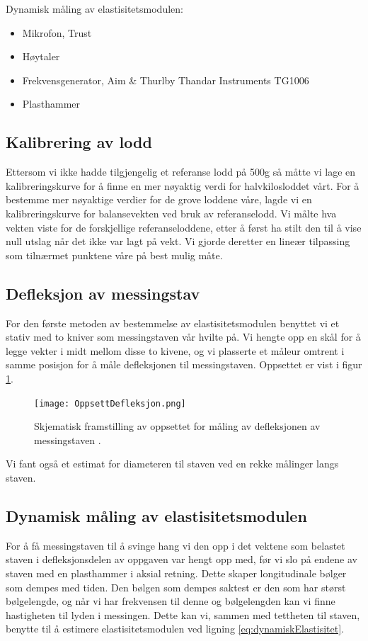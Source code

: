 \documentclass[a4paper,11pt, twocolumn]{article}
\begin{document}
Dynamisk måling av elastisitetsmodulen:
\begin{itemize}
	\item Mikrofon, Trust
	\item Høytaler 
	\item Frekvensgenerator, Aim \& Thurlby Thandar Instruments TG1006
	\item Plasthammer
\end{itemize}

\subsection{Kalibrering av lodd}
Ettersom vi ikke hadde tilgjengelig et referanse lodd på 500g så måtte vi lage en kalibreringskurve for å finne en mer nøyaktig verdi for halvkilosloddet vårt. For å bestemme mer nøyaktige verdier for de grove loddene våre, lagde vi en kalibreringskurve for balansevekten ved bruk av referanselodd. Vi målte hva vekten viste for de forskjellige referanseloddene, etter å først ha stilt den til å vise null utslag når det ikke var lagt på vekt. Vi gjorde deretter en lineær tilpassing som tilnærmet punktene våre på best mulig måte.

\subsection{Defleksjon av messingstav}
For den første metoden av bestemmelse av elastisitetsmodulen benyttet vi et stativ med to kniver som messingstaven vår hvilte på. Vi hengte opp en skål for å legge vekter i midt mellom disse to kivene, og vi plasserte et måleur omtrent i samme posisjon for å måle defleksjonen til messingstaven. Oppsettet er vist i figur \ref{fig:oppsett}.

\begin{figure}[!ht]
\texttt{[image: OppsettDefleksjon.png]}
\caption{Skjematisk framstilling av oppsettet for måling av defleksjonen av messingstaven \cite{oppgavetekst}.}
\label{fig:oppsett}
\end{figure}

Vi fant også et estimat for diameteren til staven ved en rekke målinger langs staven.

\subsection{Dynamisk måling av elastisitetsmodulen}
For å få messingstaven til å svinge hang vi den opp i det vektene som belastet staven i defleksjonsdelen av oppgaven var hengt opp med, før vi slo på endene av staven med en plasthammer i aksial retning. Dette skaper longitudinale bølger som dempes med tiden. Den bølgen som dempes saktest er den som har størst bølgelengde, og når vi har frekvensen til denne og bølgelengden kan vi finne hastigheten til lyden i messingen. Dette kan vi, sammen med tettheten til staven, benytte til å estimere elastisitetsmodulen ved ligning \eqref{eq:dynamiskElastisitet}.
\end{document}
